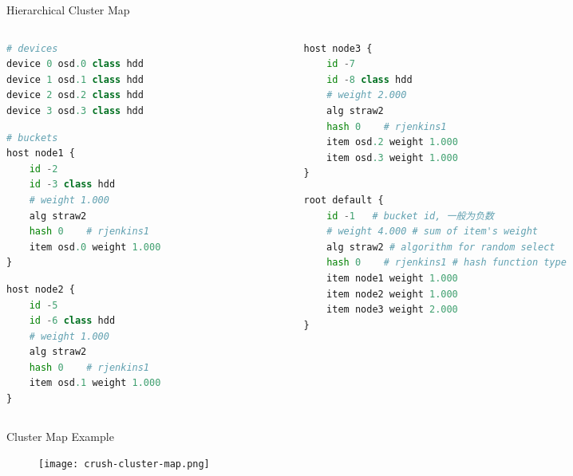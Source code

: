 \begin{frame}[fragile]{Hierarchical Cluster Map}
    \begin{columns}
        \begin{column}{0.35\textwidth}
\begin{lstlisting}[language=python]
# devices
device 0 osd.0 class hdd
device 1 osd.1 class hdd
device 2 osd.2 class hdd
device 3 osd.3 class hdd
\end{lstlisting}

\begin{lstlisting}[language=python]
# buckets
host node1 {
    id -2
    id -3 class hdd
    # weight 1.000
    alg straw2
    hash 0    # rjenkins1
    item osd.0 weight 1.000
}
\end{lstlisting}
\begin{lstlisting}[language=python]
host node2 {
    id -5
    id -6 class hdd
    # weight 1.000
    alg straw2
    hash 0    # rjenkins1
    item osd.1 weight 1.000
}
\end{lstlisting}
        \end{column}
        \begin{column}{0.55\textwidth}
            
\begin{lstlisting}[language=python]
host node3 {
    id -7
    id -8 class hdd
    # weight 2.000
    alg straw2
    hash 0    # rjenkins1
    item osd.2 weight 1.000
    item osd.3 weight 1.000
}
\end{lstlisting}

\begin{lstlisting}[language=python]
root default {
    id -1   # bucket id, 一般为负数
    # weight 4.000 # sum of item's weight
    alg straw2 # algorithm for random select
    hash 0    # rjenkins1 # hash function type
    item node1 weight 1.000
    item node2 weight 1.000
    item node3 weight 2.000
}
\end{lstlisting}
        \end{column}
    \end{columns}
\end{frame}

\begin{frame}{Cluster Map Example}
    \begin{figure}[htpb]
        \centering
        \texttt{[image: crush-cluster-map.png]}
    \end{figure}
\end{frame}

